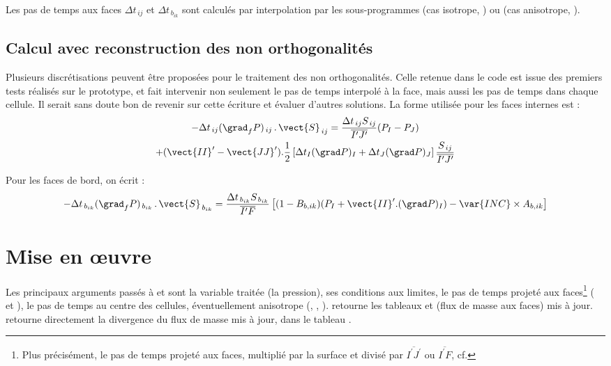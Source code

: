 Les pas de temps aux faces $\Delta t_{\,ij}$ et $\Delta t_{\,b_{ik}}$ sont calcul\'es
par interpolation par les sous-programmes  (cas isotrope,
) ou  (cas anisotrope, ).


\subsection{Calcul avec reconstruction des non orthogonalit\'es}
Plusieurs discr\'etisations peuvent \^etre propos\'ees pour le traitement des
non orthogonalit\'es. Celle retenue dans le code est issue des premiers tests
r\'ealis\'es sur le prototype, et fait intervenir non seulement le pas de temps
interpol\'e \`a la face, mais aussi les pas de temps dans chaque
cellule. Il
serait sans doute bon de revenir sur cette \'ecriture et \'evaluer d'autres
solutions. La forme utilis\'ee pour les faces internes est :
\begin{multline}
\label{Base_Itrmas_eq_intavcrec}
-\Delta t_{\,ij}(\grad_f P)_{\,ij}\,.\,\vect{S}_{\,ij}=
\frac{\Delta t_{\,ij}S_{\,ij}}{\overline{I^\prime J^\prime}}(P_I-P_J)\\
+(\vect{II}^\prime-\vect{JJ}^\prime).\frac{1}{2}\left[
\Delta t_I(\grad P)_I+\Delta t_J(\grad P)_J\right]
\frac{S_{\,ij}}{\overline{I^\prime J^\prime}}
\end{multline}

Pour les faces de bord, on \'ecrit :
\begin{equation}
\label{Base_Itrmas_eq_brdavcrec}
-\Delta t_{\,b_{ik}}(\grad_f P)_{\,b_{ik}}\,.\,\vect{S}_{\,b_{ik}}=
\frac{\Delta t_{\,b_{ik}} S_{\,b_{ik}}}{\overline{I^\prime F}}
\left[(1-B_{b,ik})(P_I+\vect{II}^\prime.(\grad P)_I)-\var{INC}\times A_{b,ik}\right]
\end{equation}

\section{Mise en \oe uvre}
Les principaux arguments pass\'es \`a  et  sont la
variable trait\'ee  (la pression), ses conditions aux limites, le pas
de temps projet\'e aux faces\footnote{%
Plus pr\'ecis\'ement, le pas de temps projet\'e aux faces, multipli\'e par la
surface et divis\'e par $\overline{I^\prime J^\prime}$ ou $\overline{I^\prime F}$, cf. }
( et ), le pas de temps au
centre des cellules, \'eventuellement anisotrope (, ,
).  retourne les tableaux  et 
(flux de masse aux faces) mis \`a jour.  retourne directement la
divergence du flux de masse mis \`a jour, dans le tableau .

